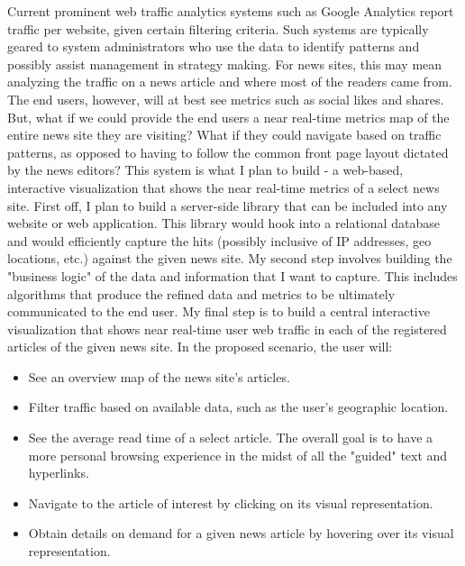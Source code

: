 \documentclass[12pt]{article}
\begin{document}
Current prominent web traffic analytics systems such as Google Analytics report traffic per website, given certain filtering criteria. Such systems are typically geared to system administrators who use the data to identify patterns and possibly assist management in strategy making. For news sites, this may mean analyzing the traffic on a news article and where most of the readers came from. The end users, however, will at best see metrics such as social likes and shares. But, what if we could provide the end users a near real-time metrics map of the entire news site they are visiting? What if they could navigate based on traffic patterns, as opposed to having to follow the common front page layout dictated by the news editors? This system is what I plan to build - a web-based, interactive visualization that shows the near real-time metrics of a select news site.
First off, I plan to build a server-side library that can be included into any website or web application. This library would hook into a relational database and would efficiently capture the hits (possibly inclusive of IP addresses, geo locations, etc.) against the given news site.
My second step involves building the "business logic" of the data and information that I want to capture. This includes algorithms that produce the refined data and metrics to be ultimately communicated to the end user.
My final step is to build a central interactive visualization that shows near real-time user web traffic in each of the registered articles of the given news site. In the proposed scenario, the user will:
\begin{itemize}
\item See an overview map of the news site's articles.
\item Filter traffic based on available data, such as the user's geographic location.
\item See the average read time of a select article. The overall goal is to have a more personal browsing experience in the midst of all the "guided" text and hyperlinks.
\item Navigate to the article of interest by clicking on its visual representation.
\item Obtain details on demand for a given news article by hovering over its visual representation.
\end{itemize}
\end{document}
